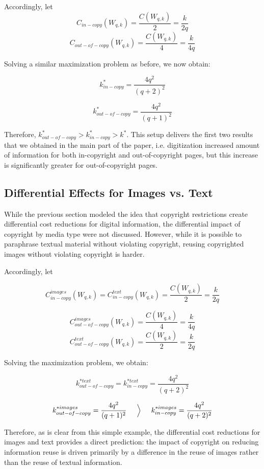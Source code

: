 \newpage

Accordingly, let $$C_{in-copy}(W_{q,k})=\frac{C(W_{q,k})}{2}=\frac{k}{2q}$$ $$C_{out-of-copy}(W_{q,k})=\frac{C(W_{q,k})}{4}=\frac{k}{4q}$$

Solving a similar maximization problem as before, we now obtain:

$$k^*_{in-copy}= \frac{4q^2}{(q+2)^2}$$

$$k^*_{out-of-copy}= \frac{4q^2}{(q+1)^2}$$

Therefore, $k^*_{out-of-copy}>k^*_{in-copy}>k^*$. This setup delivers the first two results that we obtained in the main part of the paper, i.e. digitization increased amount of information for both in-copyright and out-of-copyright pages, but this increase is significantly greater for out-of-copyright pages. 

\subsection*{Differential Effects for Images vs. Text}

While the previous section modeled the idea that copyright restrictions create differential cost reductions for digital information, the differential impact of copyright by media type were not discussed. However, while it is possible to paraphrase textual material without violating copyright, reusing copyrighted images without violating copyright is harder.

Accordingly, let

$$C^{images}_{in-copy}(W_{q,k})=C^{text}_{in-copy}(W_{q,k})=\frac{C(W_{q,k})}{2}=\frac{k}{2q}$$

$$C^{images}_{out-of-copy}(W_{q,k})=\frac{C(W_{q,k})}{4}=\frac{k}{4q}$$
$$C^{text}_{out-of-copy}(W_{q,k})=\frac{C(W_{q,k})}{2}=\frac{k}{2q}$$

Solving the maximization problem, we obtain:

$$k^{*text}_{out-of-copy}=k^{*text}_{in-copy}= \frac{4q^2}{(q+2)^2}$$

$$k^{*images}_{out-of-copy}= \frac{4q^2}{(q+1)^2} \hspace{5mm} \Big >  \hspace{5mm} k^{*images}_{in-copy}= \frac{4q^2}{(q+2)^2}$$

Therefore, as is clear from this simple example, the differential cost reductions for images and text provides a direct prediction: the impact of copyright on reducing information reuse is driven primarily by a difference in the reuse of images rather than the reuse of textual information. 


